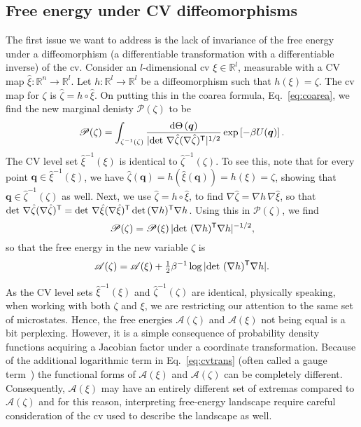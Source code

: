 \begin{subappendices}
\subsection{Free energy under CV diffeomorphisms}

The first issue we want to address is the lack of invariance of the free energy under a diffeomorphism (a differentiable transformation with a differentiable inverse) of the \ac{cv}.
Consider an $l$-dimensional \ac{cv} $\xi \in \mathbb{R}^{l}$, measurable with a CV map $\hat{\xi}: \mathbb{R}^{n} \to \mathbb{R}^{l}$.
Let $h: \mathbb{R}^{l} \to \mathbb{R}^{l}$ be a diffeomorphism such that $h(\xi) = \zeta$.
The \ac{cv} map for $\zeta$ is $\hat{\zeta} = h \circ \hat{\xi}$.
On putting this in the coarea formula, Eq.~\eqref{eq:coarea}, we find the new marginal denisty $\mathscr{P}(\zeta)$ to be
%
\begin{equation}
  \mathscr{P}(\zeta) = \int_{\zeta^{-1}(\zeta)} \frac{\mathrm{d}{\Theta}\,(\bm{q})}{\lvert\det\, \nabla \hat{\zeta}(\nabla \hat{\zeta})^\mathsf{T}\rvert^{1/2}} \exp\left[-\beta U(\bm{q})\right].
\end{equation}
%
The CV level set $\hat{\xi}^{-1}(\xi)$ is identical to $\hat{\zeta}^{-1}(\zeta)$.
To see this, note that for every point $\bm{q} \in \hat{\xi}^{-1}(\xi)$, we have $\hat{\zeta}(\bm{q}) = h(\hat{\xi}(\bm{q})) = h(\xi) = \zeta$, showing that $\bm{q} \in \hat{\zeta}^{-1}(\zeta)$ as well.
Next, we use $\hat{\zeta} = h\circ\hat{\xi}$, to find $\nabla \hat{\zeta} = \nabla h\,\nabla \hat{\xi}$, so that $\det\, \nabla\hat{\zeta}(\nabla\hat{\zeta})^\mathsf{T} = \det\, \nabla\hat{\xi}(\nabla\hat{\xi})^\mathsf{T}\det\,(\nabla h)^\mathsf{T}\nabla h$.
Using this in $\mathscr{P}(\zeta)$, we find
%
\begin{equation}
  \mathscr{P}(\zeta) = \mathscr{P}(\xi)\,\lvert\det\,{(\nabla h)^\mathsf{T} \nabla h}\rvert^{-1/2},
\end{equation}
%
so that the free energy in the new variable $\zeta$ is
%
\begin{equation}
  \mathscr{A}(\zeta) = \mathscr{A}(\xi) + \tfrac{1}{2}\beta^{-1}\log\,\lvert\det\,{(\nabla h)^\mathsf{T} \nabla h}\rvert.
  \label{eq:cvtrans}
\end{equation}

As the CV level sets $\hat{\xi}^{-1}(\xi)$ and $\hat{\zeta}^{-1}(\zeta)$ are identical, physically speaking, when working with both $\zeta$ and $\xi$, we are restricting our attention to the same set of microstates.
Hence, the free energies $\mathscr{A}(\zeta)$ and $\mathscr{A}(\xi)$ not being equal is a bit perplexing.
However, it is a simple consequence of probability density functions acquiring a Jacobian factor under a coordinate transformation.
Because of the additional logarithmic term in Eq.~\eqref{eq:cvtrans} (often called a gauge term~\cite{hartmann2011}) the functional forms of $\mathscr{A}(\xi)$ and $\mathscr{A}(\zeta)$ can be completely different.
Consequently, $\mathscr{A}(\xi)$ may have an entirely different set of extremas compared to $\mathscr{A}(\zeta)$ and for this reason, interpreting free-energy landscape require careful consideration of the \ac{cv} used to describe the landscape as well.


\end{subappendices}

